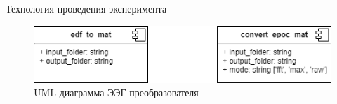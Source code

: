 \begin{frame}{Технология проведения эксперимента}
	\begin{figure}
        \includegraphics[width=\textwidth]{img/converter_uml.png}
        \caption{UML диаграмма ЭЭГ преобразователя}
    \end{figure}
\end{frame}
